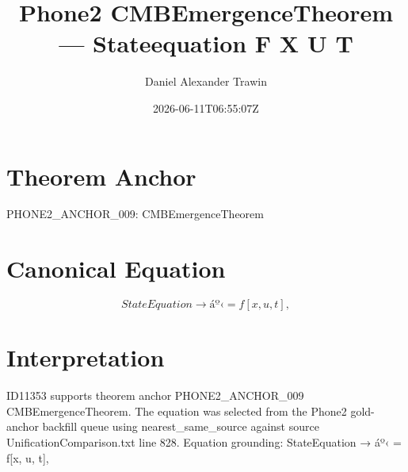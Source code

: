 \documentclass[11pt]{article}
\title{Phone2 CMBEmergenceTheorem — Stateequation F X U T}
\author{Daniel Alexander Trawin}
\date{2026-06-11T06:55:07Z}
\begin{document}
\maketitle
\section*{Theorem Anchor}
PHONE2_ANCHOR_009: CMBEmergenceTheorem
\section*{Canonical Equation}
\[
StateEquation → áº‹ = f[x, u, t],
\]
\section*{Interpretation}
ID11353 supports theorem anchor PHONE2_ANCHOR_009 CMBEmergenceTheorem. The equation was selected from the Phone2 gold-anchor backfill queue using nearest_same_source against source UnificationComparison.txt line 828. Equation grounding: StateEquation → áº‹ = f[x, u, t],
\end{document}
